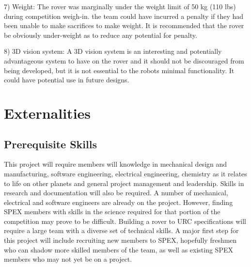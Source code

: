 \documentclass[conference]{IEEEtran} %
\begin{document}
7) Weight: The rover was marginally under the weight limit of 50 kg (110 lbs) during competition weigh-in. the team could have incurred a penalty if they had been unable to make sacrifices to make weight. It is recommended that the rover be obviously under-weight as to reduce any potential for penalty. 

8) 3D vision system: A 3D vision system is an interesting and potentially advantageous system to have on the rover and it should not be discouraged from being developed, but it is not essential to the robots minimal functionality. It could have potential use in future designs.

\section{Externalities}
\label{sec:externalities}
\subsection{Prerequisite Skills}
\label{subsec:skills}
This project will require members will knowledge in mechanical design and manufacturing, software engineering, electrical engineering, chemistry as it relates to life on other planets and general project management and leadership. Skills in research and documentation will also be required. A number of mechanical, electrical and software engineers are already on the project. However, finding SPEX members with skills in the science required for that portion of the competition may prove to be difficult. Building a rover to URC specifications will require a large team with a diverse set of technical skills. A major first step for this project will include recruiting new members to SPEX, hopefully freshmen who can shadow more skilled members of the team, as well as existing SPEX members who may not yet be on a project.
\end{document}
